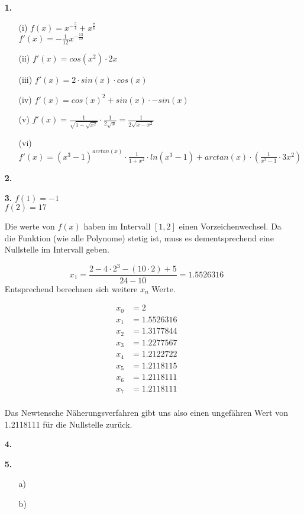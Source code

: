 \documentclass[a4paper,11pt]{scrartcl}
\author{\authorinfo}
\title{\titleinfo}
\date{\today}
\begin{document}
\maketitle
\begin{enumerate}
    \item[\textbf{1.}]
        \begin{enumerate}
            \item[(i)]
                \(f(x) = x^{-\frac{5}{4}} + x^\frac{7}{6}\) \\
                \(f'(x)= -\frac{1}{12}x^{-\frac{13}{12}}\)
            \item[(ii)]
                \(f'(x)= cos(x^2) \cdot 2x\)
            \item[(iii)]
                \(f'(x)= 2 \cdot sin(x) \cdot cos(x)\)
            \item[(iv)]
                \(f'(x)= cos(x)^2 + sin(x) \cdot - sin(x)\)
            \item[(v)]  
                \(f'(x)= \frac{1}{\sqrt{1-\sqrt{x^2}}} \cdot \frac{1}{2 \sqrt{x}} = \frac{1}{2 \sqrt{x-x^2}}\)
            \item[(vi)]
                \(f'(x)= (x^3 - 1)^{acrtan(x)} \cdot \frac{1}{1+x^2} \cdot ln(x^3 - 1) + arctan(x) \cdot \left( \frac{1}{x^3-1} \cdot 3x^2 \right) \)
        \end{enumerate}

    \item[\textbf{2.}]
            
    \item[\textbf{3.}]
        \( f(1) = -1 \) \\
        \( f(2) = 17 \) 

        Die werte von $f(x)$ haben im Intervall $[1,2]$ einen Vorzeichenwechsel. Da die Funktion (wie alle Polynome) stetig ist, muss es dementsprechend eine Nullstelle im Intervall geben.

        \[ x_1 = \frac{2 - 4 \cdot 2^3 - (10 \cdot 2) + 5}{24 - 10} = 1.5526316\]
        Entsprechend berechnen sich weitere \(x_n\) Werte.


        \begin{align*}
        x_0 &= 2 \\
        x_1 &= 1.5526316 \\
        x_2 &= 1.3177844 \\
        x_3 &= 1.2277567 \\
        x_4 &= 1.2122722 \\
        x_5 &= 1.2118115 \\
        x_6 &= 1.2118111 \\
        x_7 &= 1.2118111 \\
        \end{align*}

        Das Newtensche Näherungsverfahren gibt uns also einen ungefähren Wert von 1.2118111 für die Nullstelle zurück.

    \newpage
    \item[\textbf{4.}]
    \item[\textbf{5.}]
        \begin{enumerate}
            \item[a)]
            \item[b)]
        \end{enumerate}
    \end{enumerate}
\end{document}
